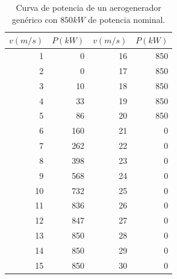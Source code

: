 \documentclass{IEEEtran}
\begin{document}
\begin{table}[H]
    \centering
    \label{Tabla: Curva de potencia}
    \caption{Curva de potencia de un aerogenerador genérico con $850 kW$ de potencia nominal.}
    \begin{tabular}{r r r r}
        \hline
        $v(m/s)$ & $P(kW)$ & $v(m/s)$ & $P(kW)$ \\
        \hline
        1 & 0 & 16 & 850 \\
        2 & 0 & 17 & 850 \\
        3 & 10 & 18 & 850 \\
        4 & 33 & 19 & 850 \\
        5 & 86 & 20 & 850 \\
        6 & 160 & 21 & 0 \\
        7 & 262 & 22 & 0 \\
        8 & 398 & 23 & 0 \\
        9 & 568 & 24 & 0 \\
        10 & 732 & 25 & 0 \\
        11 & 836 & 26 & 0 \\
        12 & 847 & 27 & 0 \\
        13 & 850 & 28 & 0 \\
        14 & 850 & 29 & 0 \\
        15 & 850 & 30 & 0 \\
        \hline
    \end{tabular}
\end{table}
\end{document}

